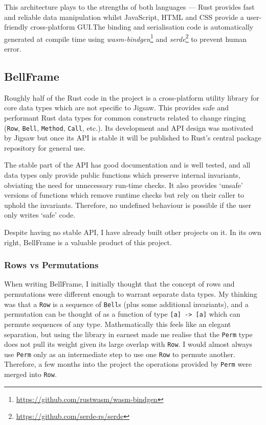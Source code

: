 \documentclass[12pt]{article}
\newcommand{\footurl}[1]{\footnote{\url{#1}}}
\begin{document}
This architecture plays to the strengths of both languages --- Rust provides fast and reliable data
manipulation whilst JavaScript, HTML and CSS provide a user-friendly cross-platform GUI.\@  The
binding and serialisation code is automatically generated at compile time using
\emph{wasm-bindgen}\footurl{https://github.com/rustwasm/wasm-bindgen} and
\emph{serde}\footurl{https://github.com/serde-rs/serde} to prevent human error.

\subsection{BellFrame}

Roughly half of the Rust code in the project is a cross-platform utility library for core data types
which are not specific to Jigsaw.  This provides safe and performant Rust data types for common
constructs related to change ringing (\verb|Row|, \verb|Bell|, \verb|Method|, \verb|Call|, etc.).
Its development and API design was motivated by Jigsaw but once its API is stable it will be
published to Rust's central package repository for general use.

The stable part of the API has good documentation and is well tested, and all data types only
provide public functions which preserve internal invariants, obviating the need for
unnecessary run-time checks.  It also provides `unsafe' versions of functions which remove runtime checks but
rely on their caller to uphold the invariants.  Therefore, no undefined behaviour is possible if
the user only writes `safe' code.

Despite having no stable API, I have already built other projects on it.  In its own right,
BellFrame is a valuable product of this project.

\subsubsection{Rows vs Permutations}

When writing BellFrame, I initially thought that the concept of rows and permutations were different
enough to warrant separate data types.  My thinking was that a \verb|Row| is a sequence of
\verb|Bell|s (plus some additional invariants), and a permutation can be thought of as a function of
type \verb|[a] -> [a]| which can permute sequences of any type.  Mathematically this feels like an
elegant separation, but using the library in earnest made me realise that the \verb|Perm| type does not
pull its weight given its large overlap with \verb|Row|.  I would almost always use
\verb|Perm| only as an intermediate step to use one \verb|Row| to permute another.  Therefore, a few
months into the project the operations provided by \verb|Perm| were merged into \verb|Row|.
\end{document}
